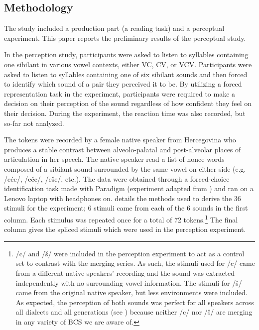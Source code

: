 \documentclass[output=paper,modfonts,nonflat,
]{langsci/langscibook}
\begin{document}
\subsection{Methodology}

The study included a production part (a reading task) and a perceptual experiment. This paper reports the preliminary results of the perceptual study.



In the perception study, participants were asked to listen to syllables containing one sibilant in various vowel contexts, either VC, CV, or VCV. Participants were asked to listen to syllables containing one of six sibilant sounds and then forced to identify which sound of a pair they perceived it to be. By utilizing a forced representation task in the experiment, participants were required to make a decision on their perception of the sound regardless of how confident they feel on their decision. During the experiment, the reaction time was also recorded, but so-far not analyzed.



The tokens were recorded by a female native speaker from Hercegovina who produces a stable contrast between alveolo-palatal and post-alveolar places of articulation in her speech. The native speaker read a list of nonce words composed of a sibilant sound surrounded by the same vowel on either side (e.g. /eće/, /eče/, /eše/, etc.). The data were obtained through a forced-choice identification task made with Paradigm (experiment adapted from \citealt{Lee2012}) and ran on a Lenovo laptop with headphones on.  details the methods used to derive the 36 stimuli for the experiment; 6 stimuli came from each of the 6 sounds in the first column. Each stimulus was repeated once for a total of 72 tokens.\footnote{/c/ and /š/ were included in the perception experiment to act as a control set to contrast with the merging series. As such, the stimuli used for /c/ came from a different native speakers' recording and the sound was extracted independently with no surrounding vowel information. The stimuli for /š/ came from the original native speaker, but less environments were included. As expected, the perception of both sounds was perfect for all speakers across all dialects and all generations (see ) because neither /c/ nor /š/ are merging in any variety of BCS we are aware of.} The final column gives the spliced stimuli which were used in the perception experiment.
\end{document}
